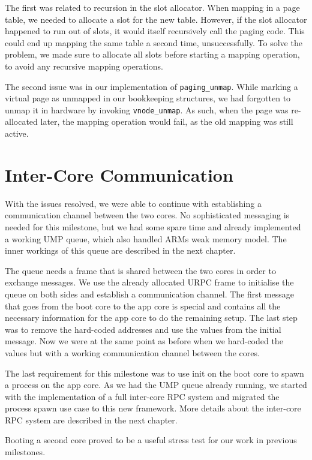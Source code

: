 The first was related to recursion in the slot allocator.
When mapping in a page table, we needed to allocate a slot for the new table.
However, if the slot allocator happened to run out of slots, it would itself recursively call the paging code.
This could end up mapping the same table a second time, unsuccessfully.
To solve the problem, we made sure to allocate all slots before starting a mapping operation, to avoid any recursive mapping operations.

The second issue was in our implementation of \verb|paging_unmap|.
While marking a virtual page as unmapped in our bookkeeping structures, we had forgotten to unmap it in hardware by invoking \verb|vnode_unmap|.
As such, when the page was re-allocated later, the mapping operation would fail, as the old mapping was still active.

\section{Inter-Core Communication}

With the issues resolved, we were able to continue with establishing a communication channel between the two cores.
No sophisticated messaging is needed for this milestone, but we had some spare time and already implemented
a working UMP queue, which also handled ARMs weak memory model. The inner workings of this queue are described in  
the next chapter.

The queue needs a frame that is shared between the two cores in order to exchange messages. We use the already allocated
URPC frame to initialise the queue on both sides and establish a communication channel. The first message that goes from
the boot core to the app core is special and contains all the necessary information for the app core to do the remaining
setup. The last step was to remove the hard-coded addresses and use the values from the initial message. Now we were at
the same point as before when we hard-coded the values but with a working communication channel between the cores.

The last requirement for this milestone was to use init on the boot core to spawn a process on the app core. As we had the
UMP queue already running, we started with the implementation of a full inter-core RPC system and migrated the process spawn
use case to this new framework. More details about the inter-core RPC system are described in the next chapter.

Booting a second core proved to be a useful stress test for our work in previous milestones.
